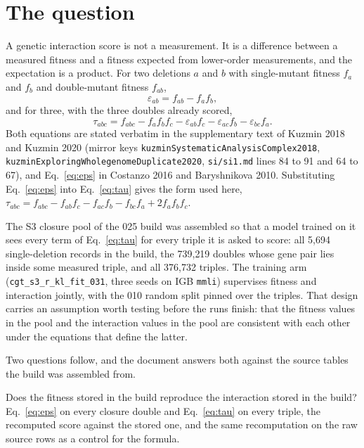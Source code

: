 
\section{The question}

A genetic interaction score is not a measurement. It is a difference between a
measured fitness and a fitness expected from lower-order measurements, and the
expectation is a product. For two deletions $a$ and $b$ with single-mutant fitness
$f_a$ and $f_b$ and double-mutant fitness $f_{ab}$,
\begin{equation}
  \varepsilon_{ab} = f_{ab} - f_a f_b ,
  \label{eq:eps}
\end{equation}
and for three, with the three doubles already scored,
\begin{equation}
  \tau_{abc} = f_{abc} - f_a f_b f_c - \varepsilon_{ab} f_c - \varepsilon_{ac} f_b
             - \varepsilon_{bc} f_a .
  \label{eq:tau}
\end{equation}
Both equations are stated verbatim in the supplementary text of Kuzmin 2018 and
Kuzmin 2020 (mirror keys \texttt{kuzminSystematicAnalysisComplex2018},
\texttt{kuzminExploringWholegenomeDuplicate2020}, \texttt{si/si1.md} lines 84 to 91
and 64 to 67), and Eq.~\ref{eq:eps} in Costanzo 2016 and Baryshnikova 2010. Substituting
Eq.~\ref{eq:eps} into Eq.~\ref{eq:tau} gives the form used here,
$\tau_{abc} = f_{abc} - f_{ab} f_c - f_{ac} f_b - f_{bc} f_a + 2 f_a f_b f_c$.

The S3 closure pool of the 025 build was assembled so that a model trained on it sees
every term of Eq.~\ref{eq:tau} for every triple it is asked to score: all 5{,}694
single-deletion records in the build, the 739{,}219 doubles whose gene pair lies
inside some measured triple, and all 376{,}732 triples. The training arm
(\texttt{cgt\_s3\_r\_kl\_fit\_031}, three seeds on IGB \texttt{mmli}) supervises
fitness and interaction jointly, with the 010 random split pinned over the triples.
That design carries an assumption worth testing before the runs finish: that the
fitness values in the pool and the interaction values in the pool are consistent with
each other under the equations that define the latter.

Two questions follow, and the document answers both against the source tables the
build was assembled from.

Does the fitness stored in the build reproduce the interaction stored in the build?
Eq.~\ref{eq:eps} on every closure double and Eq.~\ref{eq:tau} on every triple, the
recomputed score against the stored one, and the same recomputation on the raw source
rows as a control for the formula.

